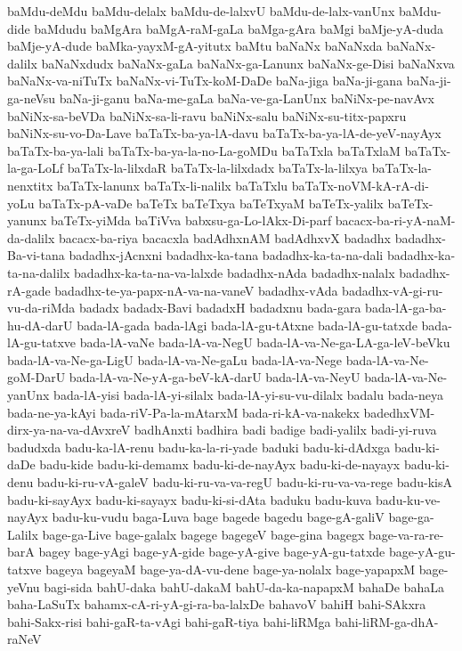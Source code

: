 {baMdu-deMdu
baMdu-delalx
baMdu-de-lalxvU
baMdu-de-lalx-vanUnx
baMdu-dide
baMdudu
baMgAra
baMgA-raM-gaLa
baMga-gAra
baMgi
baMje-yA-duda
baMje-yA-dude
baMka-yayxM-gA-yitutx
baMtu
baNaNx
baNaNxda
baNaNx-dalilx
baNaNxdudx
baNaNx-gaLa
baNaNx-ga-Lanunx
baNaNx-ge-Disi
baNaNxva
baNaNx-va-niTuTx
baNaNx-vi-TuTx-koM-DaDe
baNa-jiga
baNa-ji-gana
baNa-ji-ga-neVsu
baNa-ji-ganu
baNa-me-gaLa
baNa-ve-ga-LanUnx
baNiNx-pe-navAvx
baNiNx-sa-beVDa
baNiNx-sa-li-ravu
baNiNx-salu
baNiNx-su-titx-papxru
baNiNx-su-vo-Da-Lave
baTaTx-ba-ya-lA-davu
baTaTx-ba-ya-lA-de-yeV-nayAyx
baTaTx-ba-ya-lali
baTaTx-ba-ya-la-no-La-goMDu
baTaTxla
baTaTxlaM
baTaTx-la-ga-LoLf
baTaTx-la-lilxdaR
baTaTx-la-lilxdadx
baTaTx-la-lilxya
baTaTx-la-nenxtitx
baTaTx-lanunx
baTaTx-li-nalilx
baTaTxlu
baTaTx-noVM-kA-rA-di-yoLu
baTaTx-pA-vaDe
baTeTx
baTeTxya
baTeTxyaM
baTeTx-yalilx
baTeTx-yanunx
baTeTx-yiMda
baTiVva
babxsu-ga-Lo-lAkx-Di-parf
bacacx-ba-ri-yA-naM-da-dalilx
bacacx-ba-riya
bacacxla
badAdhxnAM
badAdhxvX
badadhx
badadhx-Ba-vi-tana
badadhx-jAcnxni
badadhx-ka-tana
badadhx-ka-ta-na-dali
badadhx-ka-ta-na-dalilx
badadhx-ka-ta-na-va-lalxde
badadhx-nAda
badadhx-nalalx
badadhx-rA-gade
badadhx-te-ya-papx-nA-va-na-vaneV
badadhx-vAda
badadhx-vA-gi-ru-vu-da-riMda
badadx
badadx-Bavi
badadxH
badadxnu
bada-gara
bada-lA-ga-ba-hu-dA-darU
bada-lA-gada
bada-lAgi
bada-lA-gu-tAtxne
bada-lA-gu-tatxde
bada-lA-gu-tatxve
bada-lA-vaNe
bada-lA-va-NegU
bada-lA-va-Ne-ga-LA-ga-leV-beVku
bada-lA-va-Ne-ga-LigU
bada-lA-va-Ne-gaLu
bada-lA-va-Nege
bada-lA-va-Ne-goM-DarU
bada-lA-va-Ne-yA-ga-beV-kA-darU
bada-lA-va-NeyU
bada-lA-va-Ne-yanUnx
bada-lA-yisi
bada-lA-yi-silalx
bada-lA-yi-su-vu-dilalx
badalu
bada-neya
bada-ne-ya-kAyi
bada-riV-Pa-la-mAtarxM
bada-ri-kA-va-nakekx
badedhxVM-dirx-ya-na-va-dAvxreV
badhAnxti
badhira
badi
badige
badi-yalilx
badi-yi-ruva
badudxda
badu-ka-lA-renu
badu-ka-la-ri-yade
baduki
badu-ki-dAdxga
badu-ki-daDe
badu-kide
badu-ki-demamx
badu-ki-de-nayAyx
badu-ki-de-nayayx
badu-ki-denu
badu-ki-ru-vA-galeV
badu-ki-ru-va-va-regU
badu-ki-ru-va-va-rege
badu-kisA
badu-ki-sayAyx
badu-ki-sayayx
badu-ki-si-dAta
baduku
badu-kuva
badu-ku-ve-nayAyx
badu-ku-vudu
baga-Luva
bage
bagede
bagedu
bage-gA-galiV
bage-ga-Lalilx
bage-ga-Live
bage-galalx
bagege
bagegeV
bage-gina
bagegx
bage-va-ra-re-barA
bagey
bage-yAgi
bage-yA-gide
bage-yA-give
bage-yA-gu-tatxde
bage-yA-gu-tatxve
bageya
bageyaM
bage-ya-dA-vu-dene
bage-ya-nolalx
bage-yapapxM
bage-yeVnu
bagi-sida
bahU-daka
bahU-dakaM
bahU-da-ka-napapxM
bahaDe
bahaLa
baha-LaSuTx
bahamx-cA-ri-yA-gi-ra-ba-lalxDe
bahavoV
bahiH
bahi-SAkxra
bahi-Sakx-risi
bahi-gaR-ta-vAgi
bahi-gaR-tiya
bahi-liRMga
bahi-liRM-ga-dhA-raNeV
}
